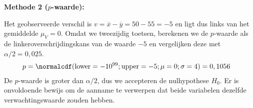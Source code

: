 {    {\bfseries Methode 2 ($p$-waarde):} 

    Het geobserveerde verschil is $v = \overline{x} - \overline{y} = 50 - 55 = -5$ en ligt dus links van het gemiddelde $\mu_V = 0$.
    Omdat we tweezijdig toetsen, berekenen we de $p$-waarde als de linkeroverschrijdingskans van de waarde $-5$ en vergelijken deze met $\alpha/2 = 0,025$.
    \begin{align*}
        p &= \normalcdf(\text{lower}=-10^{99}; \text{upper}=-5; \mu = 0; \sigma = 4) = 0,1056
    \end{align*}
    De $p$-waarde is groter dan $\alpha/2$, dus we accepteren de nulhypothese $H_0$.
    Er is onvoldoende bewijs om de aanname te verwerpen dat beide variabelen dezelfde verwachtingswaarde zouden hebben.
}